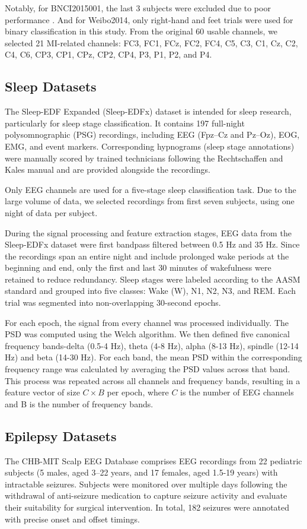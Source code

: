 \documentclass[journal,twocolumn]{IEEEtran}
\begin{document}
Notably, for BNCI2015001, the last 3 subjects were excluded due to poor performance \cite{faller2012autocalibration}. And for Weibo2014, only right-hand and feet trials were used for binary classification in this study. From the original 60 usable channels, we selected 21 MI-related channels: FC3, FC1, FCz, FC2, FC4, C5, C3, C1, Cz, C2, C4, C6, CP3, CP1, CPz, CP2, CP4, P3, P1, P2, and P4.


\subsection{Sleep Datasets}
The Sleep-EDF Expanded (Sleep-EDFx) dataset is intended for sleep research, particularly for sleep stage classification. It contains 197 full-night polysomnographic (PSG) recordings, including EEG (Fpz–Cz and Pz–Oz), EOG, EMG, and event markers. Corresponding hypnograms (sleep stage annotations) were manually scored by trained technicians following the Rechtschaffen and Kales manual and are provided alongside the recordings.

Only EEG channels are used for a five-stage sleep classification task. Due to the large volume of data, we selected recordings from first seven subjects, using one night of data per subject.

During the signal processing and feature extraction stages, EEG data from the Sleep-EDFx dataset were first bandpass filtered between 0.5 Hz and 35 Hz. Since the recordings span an entire night and include prolonged wake periods at the beginning and end, only the first and last 30 minutes of wakefulness were retained to reduce redundancy. Sleep stages were labeled according to the AASM standard and grouped into five classes: Wake (W), N1, N2, N3, and REM. Each trial was segmented into non-overlapping 30-second epochs.

For each epoch, the signal from every channel was processed individually. The PSD was computed using the Welch algorithm. We then defined five canonical frequency bands-delta (0.5-4 Hz), theta (4-8 Hz), alpha (8-13 Hz), spindle (12-14 Hz) and beta (14-30 Hz). For each band, the mean PSD within the corresponding frequency range was calculated by averaging the PSD values across that band. This process was repeated across all channels and frequency bands, resulting in a feature vector of size $C \times B$ per epoch, where $C$ is the number of EEG channels and B is the number of frequency bands.

\subsection{Epilepsy Datasets}
The CHB-MIT Scalp EEG Database comprises EEG recordings from 22 pediatric subjects (5 males, aged 3–22 years, and 17 females, aged 1.5-19 years) with intractable seizures. Subjects were monitored over multiple days following the withdrawal of anti-seizure medication to capture seizure activity and evaluate their suitability for surgical intervention. In total, 182 seizures were annotated with precise onset and offset timings.
\end{document}
